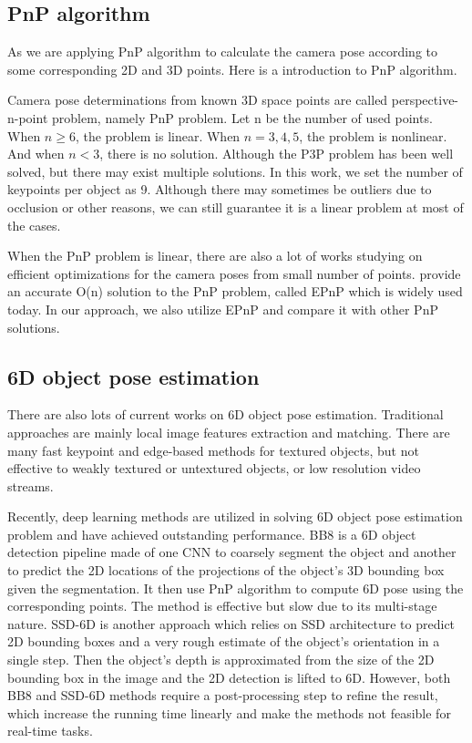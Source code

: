 \subsection{PnP algorithm}

As we are applying PnP algorithm to calculate the camera pose according to some corresponding 2D and 3D points. Here is a introduction to PnP algorithm.

Camera pose determinations from known 3D space points are called perspective-n-point problem, namely PnP problem. Let n be the number of used points. When $n \geq 6$, the problem is linear. When $n = 3,4,5$, the problem is nonlinear. And when $n < 3$, there is no solution. Although the P3P problem has been well solved, but there may exist multiple solutions. In this work, we set the number of keypoints per object as 9. Although there may sometimes be outliers due to occlusion or other reasons, we can still guarantee it is a linear problem at most of the cases.

When the PnP problem is linear, there are also a lot of works studying on efficient optimizations for the camera poses from small number of points. \cite{lepetit2009epnp} provide an accurate O(n) solution to the PnP problem, called EPnP which is widely used today. In our approach, we also utilize EPnP and compare it with other PnP solutions.

\subsection{6D object pose estimation}

There are also lots of current works on 6D object pose estimation. Traditional approaches are mainly local image features extraction and matching. There are many fast keypoint and edge-based methods for textured objects, but not effective to weakly textured or untextured objects, or low resolution video streams.

Recently, deep learning methods are utilized in solving 6D object pose estimation problem and have achieved outstanding performance. BB8 \cite{rad2017bb8} is a 6D object detection pipeline made of one CNN to coarsely segment the object and another to predict the 2D locations of the projections of the object's 3D bounding box given the segmentation. It then use PnP algorithm to compute 6D pose using the corresponding points. The method is effective but slow due to its multi-stage nature. SSD-6D \cite{kehl2017ssd} is another approach which relies on SSD architecture to predict 2D bounding boxes and a very rough estimate of the object's orientation in a single step. Then the object's depth is approximated from the size of the 2D bounding box in the image and the 2D detection is lifted to 6D. However, both BB8 and SSD-6D methods require a post-processing step to refine the result, which increase the running time linearly and make the methods not feasible for real-time tasks.

